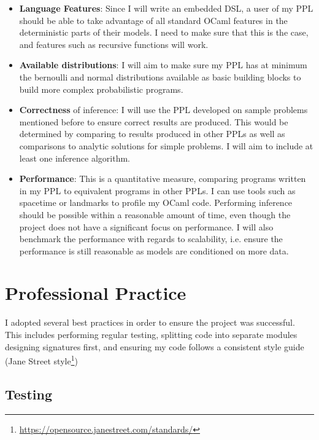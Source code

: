 \begin{itemize}
    \item \textbf{Language Features}: Since I will write an embedded DSL, a user of my PPL should be able to take advantage of all standard OCaml features in the deterministic parts of their models. I need to make sure that this is the case, and features such as recursive functions will work.
    \item \textbf{Available distributions}: I will aim to make sure my PPL has at minimum the bernoulli and normal distributions available as basic building blocks to build more complex probabilistic programs.
    \item \textbf{Correctness} of inference: I will use the PPL developed on sample problems mentioned before to ensure correct results are produced. This would be determined by comparing to results produced in other PPLs as well as comparisons to analytic solutions for simple problems. I will aim to include at least one inference algorithm.
    \item \textbf{Performance}: This is a quantitative measure, comparing programs written in my PPL to equivalent programs in other PPLs. I can use tools such as spacetime or landmarks to profile my OCaml code. Performing inference should be possible within a reasonable amount of time, even though the project does not have a significant focus on performance. I will also benchmark the performance with regards to scalability, i.e. ensure the performance is still reasonable as models are conditioned on more data.
\end{itemize}



\section{Professional Practice}

I adopted several best practices in order to ensure the project was successful. This includes performing regular testing, splitting code into separate modules designing signatures first, and ensuring my code follows a consistent style guide (Jane Street style\footnote{\url{https://opensource.janestreet.com/standards/}})

\subsection{Testing}

